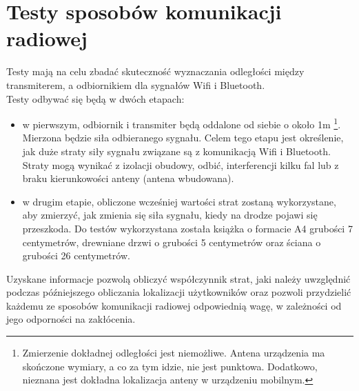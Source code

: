 \chapter{Testy sposobów komunikacji radiowej}
\label{cha:teoria}

Testy mają na celu zbadać skuteczność wyznaczania odległości między transmiterem, a odbiornikiem dla sygnałów Wifi i Bluetooth.\\
Testy odbywać się będą w dwóch etapach:
\begin{itemize}
	\item w pierwszym, odbiornik i transmiter będą oddalone od siebie o około 1m \footnote{Zmierzenie dokładnej odległości jest niemożliwe. Antena urządzenia ma skończone wymiary, a co za tym idzie, nie jest punktowa. Dodatkowo, nieznana jest dokładna lokalizacja anteny w urządzeniu mobilnym.}. Mierzona będzie siła odbieranego sygnału. Celem tego etapu jest określenie, jak duże straty siły sygnału związane są z komunikacją Wifi i Bluetooth. Straty mogą wynikać z izolacji obudowy, odbić, interferencji kilku fal lub z braku kierunkowości anteny (antena wbudowana).
	\item w drugim etapie, obliczone wcześniej wartości strat zostaną wykorzystane, aby zmierzyć, jak zmienia się siła sygnału, kiedy na drodze pojawi się przeszkoda. Do testów wykorzystana została książka o formacie A4 grubości 7 centymetrów, drewniane drzwi o grubości 5 centymetrów oraz ściana o grubości 26 centymetrów.
\end{itemize}
Uzyskane informacje pozwolą obliczyć współczynnik strat, jaki należy uwzględnić podczas późniejszego obliczania lokalizacji użytkowników oraz pozwoli przydzielić każdemu ze sposobów komunikacji radiowej odpowiednią wagę, w zależności od jego odporności na zakłócenia.
